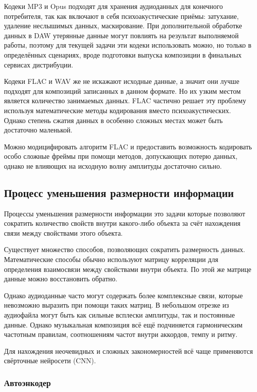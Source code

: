 \documentclass[14pt]{extarticle}
\begin{document}
Кодеки MP3 и Opus подходят для хранения аудиоданных для конечного потребителя, так как включают в себя психоакустические приёмы: 
затухание, удаление неслышимых данных, маскирование. При дополнительной обработке данных в DAW утерянные данные могут 
повлиять на результат выполняемой работы, поэтому для текущей задачи эти кодеки использовать можно, но только в определённых сценариях, 
вроде подготовки выпуска композиции в финальных сервисах дистрибуции. 

Кодеки FLAC и WAV же не искажают исходные данные, а значит они лучше подходят для композиций записанных в данном формате. Но их 
узким местом является количество занимаемых данных. FLAC частично решает эту проблему используя математические методы кодирования
вместо психоакустических. Однако степень сжатия данных в особенно сложных местах может быть достаточно маленькой.

Можно модицифировать алгоритм FLAC и предоставить возможность кодировать особо сложные фреймы при помощи методов, допускающих
потерю данных, однако не влияющих на исходную волну амплитуды достаточно сильно. 

\subsection{Процесс уменьшения размерности информации}

Процессы уменьшения размерности информации это задачи которые позволяют сократить количество свойств внутри
какого-либо объекта за счёт нахождения связи между свойствами этого объекта. 

Существует множество способов, позволяющих сократить размерность данных. Математические способы обычно используют
матрицу корреляции для определения взаимосвязи между свойствами внутри объекта. По этой же матрице данные можно
восстановить обратно. 

Однако аудиоданные часто могут содержать более комплексные связи, которые невозможно выразить при помощи таких матриц. 
В небольшом отрезке из аудиофайла могут быть как сильные всплески амплитуды, так и постоянные данные. Однако 
музыкальная композиция всё ещё подчиняется гармоническим частотным правилам, соотношениям частот внутри аккордов, 
темпу и ритму. 

Для нахождения неочевидных и сложных закономерностей всё чаще применяются свёрточные нейросети (CNN).

\subsubsection{Автоэнкодер}
\end{document}
